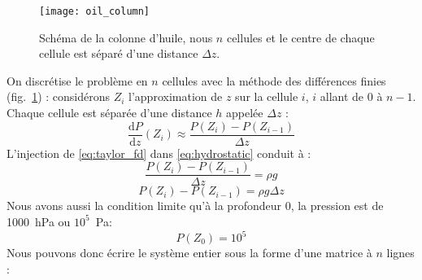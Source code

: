 \begin{figure}[!ht]
  \centering
  \texttt{[image: oil\_column]}
  \caption{Schéma de la colonne d'huile, nous $n$ cellules et le centre de chaque cellule est séparé d'une distance $\Delta{z}$.}
  \label{fig:oil_schema}
\end{figure}
%
On discrétise le problème en $n$ cellules avec la méthode des différences finies (fig.~\ref{fig:oil_schema}) : considérons $Z_i$ l'approximation de $z$ sur la cellule $i$, $i$ allant de $0$ à $n-1$.
%
Chaque cellule est séparée d'une distance $h$ appelée $\Delta{z}$ :
%
\begin{equation}
\label{eq:taylor_fd}
\frac{\mathrm d P}{\mathrm d z}(Z_i) \approx \frac{P(Z_{i}) - P(Z_{i-1})}{\Delta{z}}
\end{equation}
%
L'injection de \eqref{eq:taylor_fd} dans \eqref{eq:hydrostatic} conduit à :
%
\begin{equation}
\frac{P(Z_{i}) - P(Z_{i-1})}{\Delta{z}} = \rho{}g
\end{equation}
\begin{equation}
\label{eq:system_pressure}
P(Z_{i}) - P(Z_{i-1}) = \rho{}g\Delta{z}
\end{equation}
Nous avons aussi la condition limite qu'à la profondeur 0, la pression est de 1000~hPa ou $10^5$~Pa:
%
\begin{equation}
P(Z_0) = 10^5
\end{equation}
%
Nous pouvons donc écrire le système entier sous la forme d'une matrice à $n$ lignes :
%

